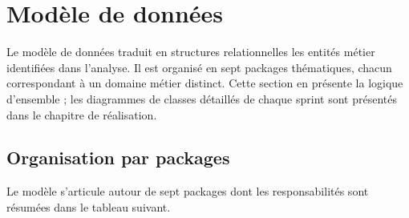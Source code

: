 \section{Modèle de données}

Le modèle de données traduit en structures relationnelles les entités métier identifiées dans l’analyse. Il est organisé en sept packages thématiques, chacun correspondant à un domaine métier distinct. Cette section en présente la logique d’ensemble ; les diagrammes de classes détaillés de chaque sprint sont présentés dans le chapitre de réalisation.

\subsection{Organisation par packages}

Le modèle s'articule autour de sept packages dont les responsabilités
sont résumées dans le tableau suivant.

